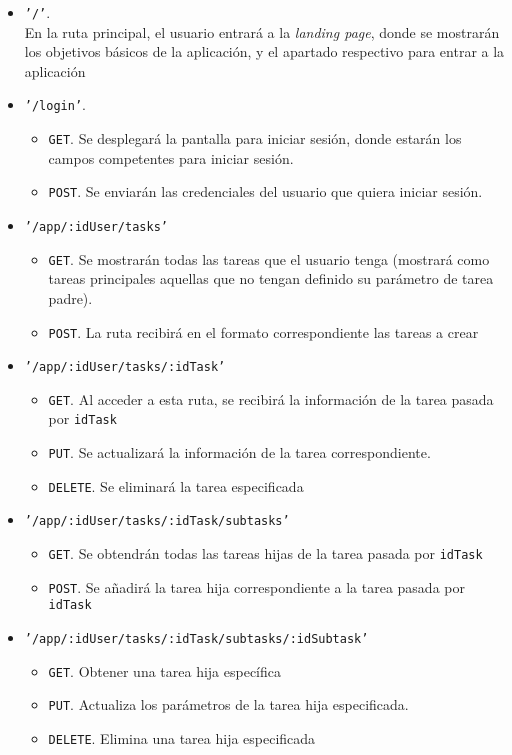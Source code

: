 \begin{itemize}
  \item \texttt{'/'}.\\
    En la ruta principal, el usuario entrar\'a a la \textit{landing page}, donde se mostrar\'an los objetivos b\'asicos de la aplicaci\'on, y el apartado respectivo para entrar a la aplicaci\'on
  \item \texttt{'/login'}.\\
    \begin{itemize}
      \item \texttt{GET}. Se desplegar\'a la pantalla para iniciar sesi\'on, donde estar\'an los campos competentes para iniciar sesi\'on.
      \item \texttt{POST}. Se enviar\'an las credenciales del usuario que quiera iniciar sesi\'on.
    \end{itemize}
  \item \texttt{'/app/:idUser/tasks'}
    \begin{itemize}
      \item \texttt{GET}. Se mostrar\'an todas las tareas que el usuario tenga (mostrar\'a como tareas principales aquellas que no tengan definido su par\'ametro de tarea padre).
      \item \texttt{POST}. La ruta recibir\'a en el formato correspondiente las tareas a crear
    \end{itemize}
  \item \texttt{'/app/:idUser/tasks/:idTask'}
    \begin{itemize}
      \item \texttt{GET}. Al acceder a esta ruta, se recibir\'a la informaci\'on de la tarea pasada por \texttt{idTask}
      \item \texttt{PUT}. Se actualizar\'a la informaci\'on de la tarea correspondiente.
      \item \texttt{DELETE}. Se eliminar\'a la tarea especificada
    \end{itemize}
  \item \texttt{'/app/:idUser/tasks/:idTask/subtasks'}
    \begin{itemize}
      \item \texttt{GET}. Se obtendr\'an todas las tareas hijas de la tarea pasada por \texttt{idTask}
      \item \texttt{POST}. Se a\~nadir\'a la tarea hija correspondiente a la tarea pasada por \texttt{idTask}
    \end{itemize}
  \item \texttt{'/app/:idUser/tasks/:idTask/subtasks/:idSubtask'}
    \begin{itemize}
      \item \texttt{GET}. Obtener una tarea hija espec\'ifica
      \item \texttt{PUT}. Actualiza los par\'ametros de la tarea hija especificada.
      \item \texttt{DELETE}. Elimina una tarea hija especificada
    \end{itemize}
\end{itemize}
